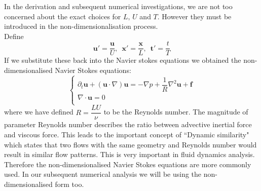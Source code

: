 In the derivation and subsequent numerical investigations, we are not too concerned about the exact choices for $L,\,U$ and $T$. However they must be introduced in the non-dimensionalisation process.\\
Define
\begin{equation}
\textbf{u}' = \dfrac{\textbf{u}}{U},\,\,\,\textbf{x}' = \dfrac{\textbf{x}}{L},\,\,\,\textbf{t}'=\dfrac{t}{T}
\end{equation}
If we substitute these back into the Navier stokes equations we obtained the non-dimensionalised Navier Stokes equations:
\begin{equation}
\begin{cases}
\partial_t \textbf{u} + (\textbf{u} \cdot \nabla)\textbf{u} = -\nabla p + \dfrac{1}{R}\nabla^2\textbf{u}+\textbf{f}\\
\nabla \cdot \textbf{u}=0\\
\end{cases}
\end{equation}
where we have defined $R = \dfrac{LU}{\nu}$ to be the Reynolds number. The magnitude of parameter Reynolds number describes the ratio between advective inertial force and viscous force. This leads to the important concept of ``Dynamic similarity" which states that two flows with the same geometry and Reynolds number would result in similar flow patterns. This is very important in fluid dynamics analysis. Therefore the non-dimensionalised Navier Stokes equations are more commonly used. In our subsequent numerical analysis we will be using the non-dimensionalised form too.

